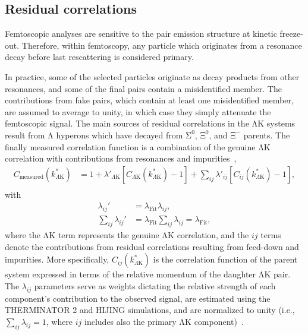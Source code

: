 \documentclass{svproc}
\newcommand{\Lam}{$\mathrm{\Lambda}$\xspace}
\newcommand{\LamK}{$\mathrm{\Lambda}\mathrm{K}$\xspace}
\begin{document}
\subsection{Residual correlations}
\label{ResidualCorrelations}

Femtoscopic analyses are sensitive to the pair emission structure at kinetic freeze-out. Therefore, within
femtoscopy, any particle which originates from a resonance decay before last rescattering is considered
primary.

In practice, some of the selected particles originate as decay products from other resonances, and some of the final pairs contain a misidentified member.
The contributions from fake pairs, which contain at least one misidentified member, are assumed to average to unity, in which case they simply attenuate the femtoscopic signal.
The main sources of residual correlations in the \LamK systems result from \Lam hyperons which have decayed from $\mathrm{\Sigma}^{0}$, $\mathrm{\Xi}^{0}$, and $\mathrm{\Xi}^{-}$ parents.
The finally measured correlation function is a combination of the genuine \LamK correlation with contributions from resonances and impurities~\cite{Kisiel:2014mma},
\begin{equation}
\begin{aligned}
\label{eqn:CfwRes} 
 C_{\mathrm{measured}}(k^{*}_{\Lambda\mathrm{K}}) &= 1 + \lambda'_{\Lambda\mathrm{K}}[C_{\Lambda\mathrm{K}}(k^{*}_{\Lambda\mathrm{K}}) - 1] + \sum\limits_{ij}  \lambda'_{ij}[C_{ij}(k^{*}_{\Lambda\mathrm{K}})-1], \\
\end{aligned} 
\end{equation}
with
\begin{equation}
\begin{aligned}
\label{eqn:CfwRes2} 
 \lambda_{ij}' &= \lambda_{\mathrm{Fit}}\lambda_{ij}, \\
 \sum\limits_{ij}\lambda_{ij}' &=  \lambda_{\mathrm{Fit}}\sum\limits_{ij}\lambda_{ij} = \lambda_{\mathrm{Fit}},
\end{aligned} 
\end{equation}
where the \LamK term represents the genuine \LamK correlation, and the $ij$ terms denote the contributions from residual correlations resulting from feed-down and impurities.
More specifically, $C_{ij}(k^{*}_{\Lambda\mathrm{K}})$ is the correlation function of the parent system expressed in terms of the relative momentum of the daughter \LamK pair.  
The $\lambda_{ij}$ parameters serve as weights dictating the relative strength of each component's contribution to the observed signal, are estimated using the THERMINATOR 2 and HIJING simulations, and are normalized to unity (i.e., $\sum_{ij} \lambda_{ij} = 1$, where $ij$ includes also the primary \LamK component)~\cite{Kisiel:2014mma,Acharya:2018gyz}.
\end{document}

